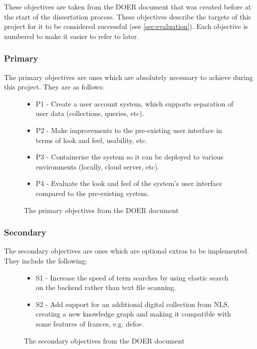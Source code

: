 \documentclass[12pt, letterpaper]{article}
\begin{document}
\begin{flushleft}
These objectives are taken from the DOER document that was created before at the start of the dissertation process. These objectives describe the targets of this project for it to be considered successful (see \ref{sec:evaluation}). Each objective is numbered to make it easier to refer to later.
\end{flushleft}

\subsubsection{Primary}\label{sec:objectives-primary}

\begin{flushleft}
The primary objectives are ones which are absolutely necessary to achieve during this project. They are as follows:
\end{flushleft}

\begin{flushleft}
\begin{figure}[H]
    \begin{itemize}
    \item P1 - Create a user account system, which supports separation of user data (collections, queries, etc).
    \item P2 - Make improvements to the pre-existing user interface in terms of look and feel, usability, etc.
    \item P3 - Containerise the system so it can be deployed to various environments (locally, cloud server, etc).
    \item P4 - Evaluate the look and feel of the system’s user interface compared to the pre-existing system.
    \end{itemize}
\caption{The primary objectives from the DOER document}
\end{figure}
\end{flushleft}

\subsubsection{Secondary}\label{sec:objectives-secondary}

\begin{flushleft}
The secondary objectives are ones which are optional extras to be implemented. They include the following:
\end{flushleft}

\begin{flushleft}
\begin{figure}[H]
    \begin{itemize}
    \item S1 - Increase the speed of term searches by using elastic search on the backend rather than text file scanning.
    \item S2 - Add support for an additional digital collection from NLS, creating a new knowledge graph and making it compatible with some features of frances, e.g. defoe.
    \end{itemize}
\caption{The secondary objectives from the DOER document}
\end{figure}
\end{flushleft}
\end{document}
